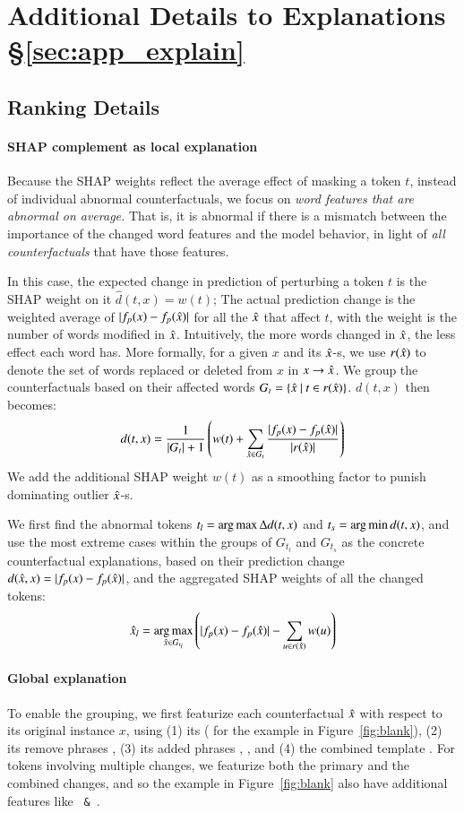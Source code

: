 \section{Additional Details to Explanations \S\ref{sec:app_explain}}
\label{appendix:explanation}


\subsection{Ranking Details}
\label{appendix:exp_rank}

\paragraph{SHAP complement as local explanation}
Because the SHAP weights reflect the average effect of masking a token $t$, instead of individual abnormal counterfactuals, we focus on \emph{word features that are abnormal on average.}
That is, it is abnormal if there is a mismatch between the importance of the changed word features and the model behavior, in light of \emph{all counterfactuals} that have those features.

In this case, the expected change in prediction of perturbing a token $t$ is the SHAP weight on it $\hat{d}(t, x) = w(t)$; The actual prediction change is the weighted average of $|f_p(x)-f_p(\hat{x})|$ for all the $\hat{x}$ that affect $t$, with the weight is the number of words modified in $\hat{x}$. 
Intuitively, the more words changed in $\hat{x}$, the less effect each word has.
More formally, for a given $x$ and its $\hat{x}$-s, we use $r(\hat{x})$ to denote the set of words replaced or deleted from $x$ in $x \rightarrow \hat{x}$.
We group the counterfactuals based on their affected words $G_t = \{\hat{x}\ |\ t \in r(\hat{x})\}$. $d(t, x)$ then becomes:
$$d(t, x) = \frac{1}{|G_t|+1} \left(w(t) + \sum_{\hat{x} \in G_t} \frac{|f_p(x)-f_p(\hat{x})|}{|r(\hat{x})|}\right)$$
We add the additional SHAP weight $w(t)$ as a smoothing factor to punish dominating outlier $\hat{x}$-s.

We first find the abnormal tokens $t_l = \operatorname*{arg\,max} \Delta d(t, x)$ and $t_s = \operatorname*{arg\,min} d(t, x)$, and use the most extreme cases within the groups of $G_{t_l}$ and $G_{t_s}$ as the concrete counterfactual explanations, based on their prediction change $d(\hat{x}, x) = |f_p(x)-f_p(\hat{x})|$, and the aggregated SHAP weights of all the changed tokens:
$$\hat{x}_l = \operatorname*{arg\,max}_{\hat{x} \in G_{t_l}} \left( |f_p(x)-f_p(\hat{x})| - \sum_{u\in r(\hat{x})} w(u) \right)$$ 



\paragraph{Global explanation}
To enable the grouping, we first featurize each counterfactual $\hat{x}$ with respect to its original instance $x$, using 
(1) its \tagstr ( for the example in Figure~\ref{fig:blank}), 
(2) its remove phrases , 
(3) its added phrases , , and 
(4) the combined template .
For tokens involving multiple changes, we featurize both the primary and the combined changes, and so the example in Figure~\ref{fig:blank} also have additional features like \texttt{ \& }.


